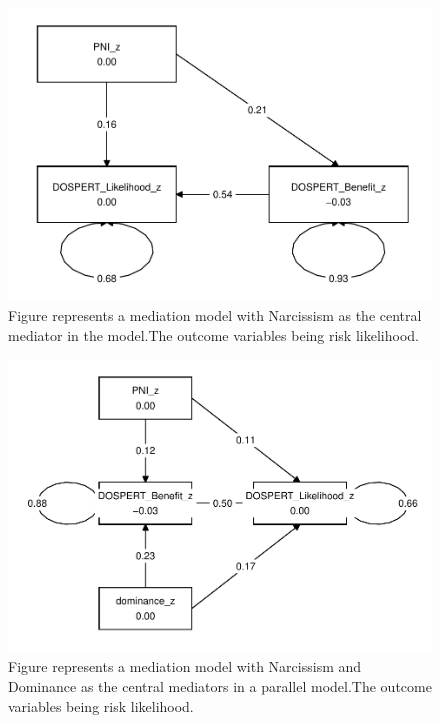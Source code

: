 \documentclass[
  donotrepeattitle,doc, 12pt, a4paper,floatsintext]{apa7}
\begin{document}
\newpage
\begin{figure}

{\centering \includegraphics[width=1\linewidth]{Output_Files/DoPL-Experiment_files/figure-latex/MediationFit1-1} 

}

\caption{Figure represents a mediation model with Narcissism as the central mediator in the model.The outcome variables being risk likelihood.}\label{fig:MediationFit1}
\end{figure}
\begin{figure}

{\centering \includegraphics[width=1\linewidth]{Output_Files/DoPL-Experiment_files/figure-latex/MediationFit2-1} 

}

\caption{Figure represents a mediation model with Narcissism and Dominance as the central mediators in a parallel model.The outcome variables being risk likelihood.}\label{fig:MediationFit2}
\end{figure}
\end{document}
